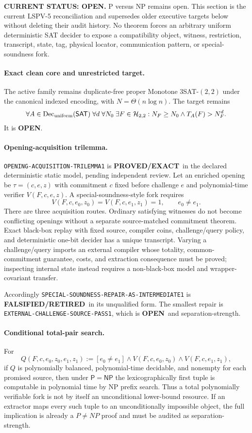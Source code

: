 \documentclass[11pt]{article}
\newcommand{\statusproved}{\textcolor{proved}{\textbf{PROVED/EXACT}}}
\newcommand{\statusopen}{\textcolor{openstatus}{\textbf{OPEN}}}
\newcommand{\statusretired}{\textcolor{retired}{\textbf{FALSIFIED/RETIRED}}}
\begin{document}
\begin{statusbox}
\textbf{CURRENT STATUS: OPEN.} P versus NP remains open. This section is the
current LSPV-5 reconciliation and supersedes older executive targets below
without deleting their audit history. No theorem forces an arbitrary uniform
deterministic SAT decider to expose a compatibility object, witness,
restriction, transcript, state, tag, physical locator, communication pattern,
or special-soundness fork.
\end{statusbox}

\paragraph{Exact clean core and unrestricted target.}
The active family remains duplicate-free proper Monotone $3$SAT-$(2,2)$ under
the canonical indexed encoding, with $N=\Theta(n\log n)$. The target remains
\[
 \forall A\in\operatorname{Dec}_{\rm uniform}(\mathsf{SAT})\;
 \forall d\;\forall N_0\;\exists F\in\mathcal H_{2,2}:
 N_F\ge N_0\land T_A(F)>N_F^d.
\]
It is \statusopen.

\paragraph{Opening-acquisition trilemma.}
\texttt{OPENING-ACQUISITION-TRILEMMA1} is \statusproved\ in the declared
deterministic static model, pending independent review.  Let an enriched
opening be $\tau=(c,e,z)$ with commitment $c$ fixed before challenge $e$ and
polynomial-time verifier $V(F,c,e,z)$.  A special-soundness-style fork requires
\[
 V(F,c,e_0,z_0)=V(F,c,e_1,z_1)=1,\qquad e_0\ne e_1.
\]
There are three acquisition routes.  Ordinary satisfying witnesses do not
become conflicting openings without a separate source-matched commitment
theorem.  Exact black-box replay with fixed source, compiler coins,
challenge/query policy, and deterministic one-bit decider has a unique
transcript.  Varying a challenge/query imports an external compiler whose
totality, common-commitment guarantee, costs, and extraction consequence must
be proved; inspecting internal state instead requires a non-black-box model
and wrapper-covariant transfer.

Accordingly \texttt{SPECIAL-SOUNDNESS-REPAIR-AS-INTERMEDIATE1} is
\statusretired\ in its unqualified form.  The smallest repair is
\texttt{EXTERNAL-CHALLENGE-SOURCE-PASS1}, which is \statusopen\ and
separation-strength.

\paragraph{Conditional total-pair search.}
For
\[
 Q(F,c,e_0,z_0,e_1,z_1):=[e_0\ne e_1]\wedge
 V(F,c,e_0,z_0)\wedge V(F,c,e_1,z_1),
\]
if $Q$ is polynomially balanced, polynomial-time decidable, and nonempty for
each promised source, then under $\mathsf P=\mathsf{NP}$ the
lexicographically first tuple is computable in polynomial time by NP prefix
search.  Thus a total polynomially verifiable fork is not by itself an
unconditional lower-bound resource.  If an extractor maps every such tuple to
an unconditionally impossible object, the full implication is already a
$P\ne NP$ proof and must be audited as separation-strength.
\end{document}
